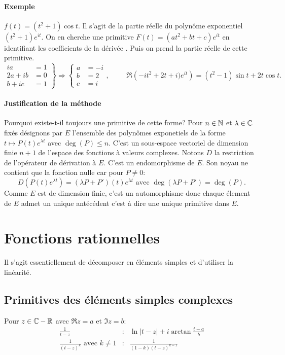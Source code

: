 \paragraph{Exemple} $f(t)=(t^2+1)\cos t$.\newline
Il s'agit de la partie réelle du polynôme exponentiel $(t^2+1)e^{it}$. On en cherche une primitive $F(t) = (at^2 + bt +c)e^{it}$ en identifiant les coefficients de la dérivée . Puis on prend la partie réelle de cette primitive.
\[
\left. 
\begin{aligned}
 ia &= 1 \\
 2a + ib &= 0\\
 b + ic &= 1
\end{aligned}
\right\rbrace \Rightarrow
\left\lbrace 
\begin{aligned}
 a &= -i \\
 b &= 2 \\
 c &= i
\end{aligned}
\right. , \hspace{1cm}
\Re\left( -it^2+2t+i)e^{it}\right) = (t^2 -1)\sin t +2t\cos t. 
\]


\paragraph{Justification de la méthode} Pourquoi existe-t-il toujours une primitive de cette forme? 
Pour $n\in \mathbb{N}$ et $\lambda \in \mathbb{C}$ fixés désignons par $E$ l'ensemble des polynômes exponetiels de la forme $t \mapsto P(t)e^{\lambda t}$ avec $\deg(P) \leq n$. \newline
C'est un sous-espace vectoriel de dimension finie $n+1$ de l'espace des fonctions à valeurs complexes. Notons $D$ la restriction de l'opérateur de dérivation à $E$. C'est un endomorphisme de $E$. Son noyau ne contient que la fonction nulle car pour $P\neq 0$:
\[
 D(P(t)e^{\lambda t}) = (\lambda P + P')(t)e^{\lambda t} \text{ avec } \deg(\lambda P + P') = \deg(P).
\]
Comme $E$ est de dimension finie, c'est un automorphisme donc chaque élement de $E$ admet un unique antécédent c'est à dire une unique primitive dans $E$.

\section{Fonctions rationnelles}
Il s'agit essentiellement de décomposer en éléments simples et d'utiliser la linéarité.
\subsection{Primitives des éléments simples complexes}
Pour $z\in\mathbb{C} -\mathbb{R}$ avec $\Re z =a$ et $\Im z=b$:
\begin{align*}
 \frac{1}{t-z}    &:& \ln |t-z| +i \arctan\frac{t-a}{b} \\
\frac{1}{(t-z)^k} \text{ avec } k\neq 1   &:& \frac{1}{(1-k)(t-z)^{k-1}}
\end{align*}

